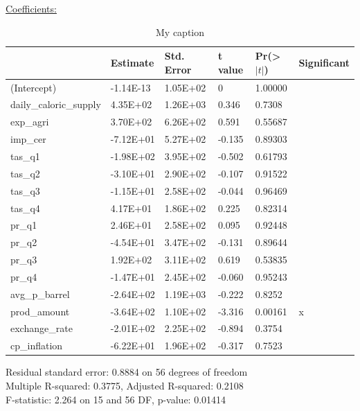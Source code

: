 \documentclass[12pt,a4paper,english]{article}
\begin{document}
\underline{Coefficients:}
\FloatBarrier
\begin{table}[!htbp]
\centering
\begin{tabular}{llllll}
\hline
                       & Estimate  & Std. Error & t value & Pr(\textgreater$|t|$) & Significant \\ \hline
(Intercept)            & -1.14E-13 & 1.05E+02   & 0       & 1.00000             &             \\
daily\_caloric\_supply & 4.35E+02  & 1.26E+03   & 0.346   & 0.7308              &             \\
exp\_agri              & 3.70E+02  & 6.26E+02   & 0.591   & 0.55687             &             \\
imp\_cer               & -7.12E+01 & 5.27E+02   & -0.135  & 0.89303             &             \\
tas\_q1                & -1.98E+02 & 3.95E+02   & -0.502  & 0.61793             &             \\
tas\_q2                & -3.10E+01 & 2.90E+02   & -0.107  & 0.91522             &             \\
tas\_q3                & -1.15E+01 & 2.58E+02   & -0.044  & 0.96469             &             \\
tas\_q4                & 4.17E+01  & 1.86E+02   & 0.225   & 0.82314             &             \\
pr\_q1                 & 2.46E+01  & 2.58E+02   & 0.095   & 0.92448             &             \\
pr\_q2                 & -4.54E+01 & 3.47E+02   & -0.131  & 0.89644             &             \\
pr\_q3                 & 1.92E+02  & 3.11E+02   & 0.619   & 0.53835             &             \\
pr\_q4                 & -1.47E+01 & 2.45E+02   & -0.060  & 0.95243             &             \\
avg\_p\_barrel         & -2.64E+02 & 1.19E+03   & -0.222  & 0.8252              &             \\
prod\_amount           & -3.64E+02 & 1.10E+02   & -3.316  & 0.00161             & x           \\
exchange\_rate         & -2.01E+02 & 2.25E+02   & -0.894  & 0.3754              &             \\
cp\_inflation          & -6.22E+01 & 1.96E+02   & -0.317  & 0.7523              &            \\ \hline
\end{tabular}
\caption{My caption}
\label{my-label}
\end{table}
\FloatBarrier
Residual standard error: 0.8884 on 56 degrees of freedom \\
Multiple R-squared:  0.3775,	Adjusted R-squared:  0.2108 \\ 
F-statistic: 2.264 on 15 and 56 DF,  p-value: 0.01414
\end{document}
